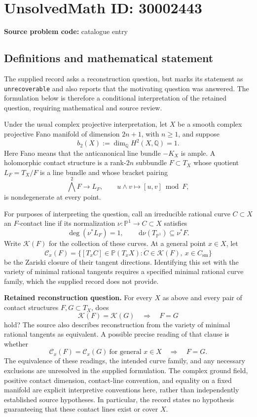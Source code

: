 \documentclass[11pt]{article}
\newcommand{\Q}{\mathbb{Q}}
\newcommand{\PP}{\mathbb{P}}
\newcommand{\dd}{\,\mathrm{d}}
\begin{document}
\section*{UnsolvedMath ID: 30002443}
\textbf{Source problem code:} catalogue entry
\subsection{Definitions and mathematical statement}
The supplied record asks a reconstruction question, but marks its statement as \texttt{unrecoverable} and also reports that the motivating question was answered. The formulation below is therefore a conditional interpretation of the retained question, requiring mathematical and source review.

Under the usual complex projective interpretation, let \(X\) be a smooth complex projective Fano manifold of dimension \(2n+1\), with \(n\geq 1\), and suppose
\[
b_2(X):=\dim_{\Q}H^2(X,\Q)=1.
\]
Here Fano means that the anticanonical line bundle \(-K_X\) is ample. A holomorphic contact structure is a rank-\(2n\) subbundle \(F\subset T_X\) whose quotient \(L_F=T_X/F\) is a line bundle and whose bracket pairing
\[
\bigwedge^2F\longrightarrow L_F,\qquad u\wedge v\longmapsto [u,v]\bmod F,
\]
is nondegenerate at every point.

For purposes of interpreting the question, call an irreducible rational curve \(C\subset X\) an \(F\)-contact line if its normalization \(\nu:\PP^1\to C\subset X\) satisfies
\[
\deg(\nu^*L_F)=1,
\qquad
\dd\nu(T_{\PP^1})\subseteq\nu^*F.
\]
Write \(\mathcal K(F)\) for the collection of these curves. At a general point \(x\in X\), let
\[
\mathcal C_x(F)=\overline{\{[T_xC]\in\PP(T_xX):C\in\mathcal K(F),\ x\in C_{\mathrm{sm}}\}}
\]
be the Zariski closure of their tangent directions. Identifying this set with the variety of minimal rational tangents requires a specified minimal rational curve family, which the supplied record does not provide.

\textbf{Retained reconstruction question.} For every \(X\) as above and every pair of contact structures \(F,G\subset T_X\), does
\[
\mathcal K(F)=\mathcal K(G)\quad\Longrightarrow\quad F=G
\]
hold? The source also describes reconstruction from the variety of minimal rational tangents as equivalent. A possible precise reading of that clause is whether
\[
\mathcal C_x(F)=\mathcal C_x(G)\ \text{for general }x\in X
\quad\Longrightarrow\quad F=G.
\]
The equivalence of these readings, the intended curve family, and any necessary exclusions are unresolved in the supplied formulation. The complex ground field, positive contact dimension, contact-line convention, and equality on a fixed manifold are explicit interpretive conventions here, rather than independently established source hypotheses. In particular, the record states no hypothesis guaranteeing that these contact lines exist or cover \(X\).
\end{document}
